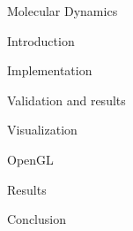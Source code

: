 \documentclass[twoside,english, a4paper, 12pt]{uiofysmaster}
\begin{document}
\begin{part}{Molecular Dynamics}
  \label{chap:md}
  \begin{chapter}{Introduction}
  
  
  
  
  
  
  \end{chapter}

  \begin{chapter}{Implementation}
    
    
    
    
  \end{chapter}

  \begin{chapter}{Validation and results}
    
    
  \end{chapter}  
\end{part}

\begin{part}{Visualization}
  
  \begin{chapter}{OpenGL}
    
    
    
    
    
    
  \end{chapter}

  \begin{chapter}{Results}
    
  \end{chapter}
\end{part}

\begin{part}{Conclusion}
  
\end{part}
\begin{appendices}

\end{appendices}

\printbibliography
\end{document}
